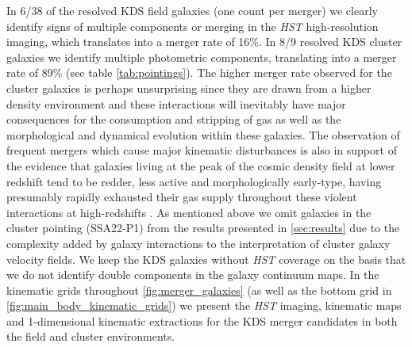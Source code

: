 \documentclass[fleqn,usenatbib]{mn2e}
\begin{document}
In 6/38 of the resolved KDS field galaxies (one count per merger) we clearly identify signs of multiple components or merging in the {\em HST} high-resolution imaging, which translates into a merger rate of 16\%.
In 8/9 resolved KDS cluster galaxies we identify multiple photometric components, translating into a merger rate of 89\%  (see table \ref{tab:pointings}).
The higher merger rate observed for the cluster galaxies is perhaps unsurprising since they are drawn from a higher density environment and these interactions will inevitably have major consequences for the consumption and stripping of gas as well as the morphological and dynamical evolution within these galaxies.
The observation of frequent mergers which cause major kinematic disturbances is also in support of the evidence that galaxies living at the peak of the cosmic density field at lower redshift tend to be redder, less active and morphologically early-type, having presumably rapidly exhausted their gas supply throughout these violent interactions at high-redshifts \citep[e.g.][]{Steidel1998,White2007,Kodama2007,Zheng2009}.
As mentioned above we omit galaxies in the cluster pointing (SSA22-P1) from the results presented in \cref{sec:results} due to the complexity added by galaxy interactions to the interpretation of cluster galaxy velocity fields.
We keep the KDS galaxies without {\em HST} coverage on the basis that we do not identify double components in the galaxy continuum maps. 
In the kinematic grids throughout \ref{fig:merger_galaxies} (as well as the bottom grid in \ref{fig:main_body_kinematic_grids}) we present the {\em HST} imaging, kinematic maps and 1-dimensional kinematic extractions for the KDS merger candidates in both the field and cluster environments.
\end{document}
